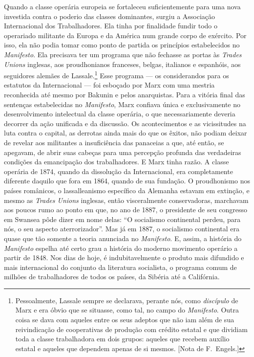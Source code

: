 Quando a classe operária europeia se fortaleceu suficientemente para
uma nova investida contra o poderio das classes dominantes, surgiu a
Associação Internacional dos Trabalhadores. Ela tinha por finalidade
fundir todo o operariado militante da Europa e da América num grande
corpo de exército. Por isso, ela não podia tomar como ponto de partida
os princípios estabelecidos no \textit{Manifesto}. Ela precisava ter um
programa que não fechasse as portas às \textit{Trades Unions} inglesas,
aos proudhonianos franceses, belgas, italianos e espanhóis, aos
seguidores alemães de Lassale.\footnote{Pessoalmente, Lassale sempre se
declarava, perante nós, como \textit{discípulo} de Marx e era óbvio que se
situasse, como tal, no campo do \textit{Manifesto}. Outra coisa se dava
com aqueles entre os seus adeptos que não iam além de sua reivindicação
de cooperativas de produção com crédito estatal e que dividiam toda a
classe trabalhadora em dois grupos: aqueles que recebem auxílio estatal
e aqueles que dependem apenas de si mesmos. [Nota de F.~Engels.]}  Esse
programa --- os considerandos para os estatutos da Internacional --- foi
esboçado por Marx com uma mestria reconhecida até mesmo por Bakunin e
pelos anarquistas. Para a vitória final das sentenças estabelecidas no
\textit{Manifesto}, Marx confiava única e exclusivamente no
desenvolvimento intelectual da classe operária, o que necessariamente
deveria decorrer da ação unificada e da discussão. Os acontecimentos e
as vicissitudes na luta contra o capital, as derrotas ainda mais do que
os êxitos, não podiam deixar de revelar aos militantes a insuficiência
das panaceias a que, até então, se apegavam, de abrir suas cabeças para
uma percepção profunda das verdadeiras condições da emancipação dos
trabalhadores. E Marx tinha razão. A classe operária de 1874, quando da
dissolução da Internacional, era completamente diferente daquilo que
fora em 1864, quando de sua fundação. O proudhonismo nos países
românicos, o lassalleanismo específico da Alemanha estavam em extinção,
e mesmo as \textit{Trades Unions} inglesas, então visceralmente
conservadoras, marchavam aos poucos rumo ao ponto em que, no ano de
1887, o presidente de seu congresso em Swansea pôde dizer em nome
delas: ``O socialismo continental perdeu, para nós, o seu aspecto
aterrorizador''. Mas já em 1887, o socialismo continental era quase que
tão somente a teoria anunciada no \textit{Manifesto}. E, assim, a
história do \textit{Manifesto} espelha até certo grau a história do
moderno movimento operário a partir de 1848. Nos dias de hoje, é
indubitavelmente o produto mais difundido e mais internacional do
conjunto da literatura socialista, o programa comum de milhões de
trabalhadores de todos os países, da Sibéria até a Califórnia.


